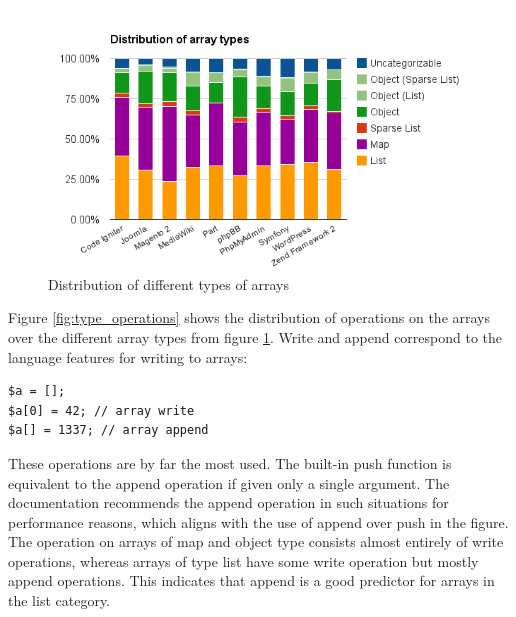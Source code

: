 \begin{figure}[htbp]
\centering
\includegraphics[width=\textwidth]{chapters/study/g1.png}
\caption{Distribution of different types of arrays}
\label{fig:array_types}
\end{figure}

Figure \ref{fig:type_operations} shows the distribution of operations on the arrays over the different array types from figure \ref{fig:array_types}. Write and append correspond to the language features for writing to arrays:

\begin{lstlisting}
$a = [];
$a[0] = 42; // array write
$a[] = 1337; // array append
\end{lstlisting}

These operations are by far the most used. The built-in push function is equivalent to the append operation if given only a single argument. The documentation recommends the append operation in such situations for performance reasons, which aligns with the use of append over push in the figure. The operation on arrays of map and object type consists almost entirely of write operations, whereas arrays of type list have some write operation but mostly append operations. This indicates that append is a good predictor for arrays in the list category.

